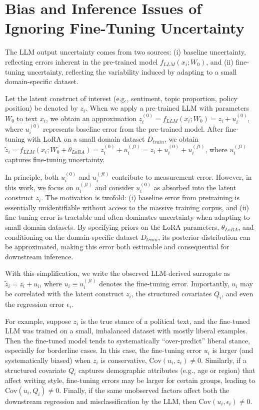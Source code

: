 \documentclass[11pt]{article}
\begin{document}
\newpage
\appendix

\section{Bias and Inference Issues of Ignoring Fine-Tuning Uncertainty}

The LLM output uncertainty comes from two sources: (i) baseline uncertainty, reflecting errors inherent in the pre-trained model $f_{LLM}(x_i; W_0)$, and (ii) fine-tuning uncertainty, reflecting the variability induced by adapting to a small domain-specific dataset.

Let the latent construct of interest (e.g., sentiment, topic proportion, policy position) be denoted by $z_i$. When we apply a pre-trained LLM with parameters $W_0$ to text $x_i$, we obtain an approximation $z_i^{(0)} = f_{LLM}(x_i; W_0) = z_i + u_i^{(0)}$, where $u_i^{(0)}$ represents baseline error from the pre-trained model. After fine-tuning with LoRA on a small domain dataset $D_{train}$, we obtain $\tilde{z}_i = f_{LLM}(x_i; W_0 + \theta_{LoRA}) = z_i^{(0)} + u_i^{(ft)} = z_i + u_i^{(0)} + u_i^{(ft)}$, where $u_i^{(ft)}$ captures fine-tuning uncertainty.

In principle, both $u_i^{(0)}$ and $u_i^{(ft)}$ contribute to measurement error. However, in this work, we focus on $u_i^{(ft)}$ and consider $u_i^{(0)}$ as absorbed into the latent construct $z_i$. The motivation is twofold: (i) baseline error from pretraining is essentially unidentifiable without access to the massive training corpus, and (ii) fine-tuning error is tractable and often dominates uncertainty when adapting to small domain datasets. By specifying priors on the LoRA parameters, $\theta_{LoRA}$, and conditioning on the domain-specific dataset $D_{train}$, its posterior distribution can be approximated, making this error both estimable and consequential for downstream inference.

With this simplification, we write the observed LLM-derived surrogate as $\tilde{z}_i = z_i + u_i$, where $u_i \equiv u_i^{(ft)}$ denotes the fine-tuning error. Importantly, $u_i$ may be correlated with the latent construct $z_i$, the structured covariates $Q_i$, and even the regression error $\epsilon_i$.

For example, suppose $z_i$ is the true stance of a political text, and the fine-tuned LLM was trained on a small, imbalanced dataset with mostly liberal examples. Then the fine-tuned model tends to systematically ``over-predict'' liberal stance, especially for borderline cases. In this case, the fine-tuning error $u_i$ is larger (and systematically biased) when $z_i$ is conservative, $\text{Cov}(u_i, z_i) \neq 0$. Similarly, if a structured covariate $Q_i$ captures demographic attributes (e.g., age or region) that affect writing style, fine-tuning errors may be larger for certain groups, leading to $\text{Cov}(u_i, Q_i) \neq 0$. Finally, if the same unobserved factors affect both the downstream regression and misclassification by the LLM, then $\text{Cov}(u_i, \epsilon_i) \neq 0$.
\end{document}
